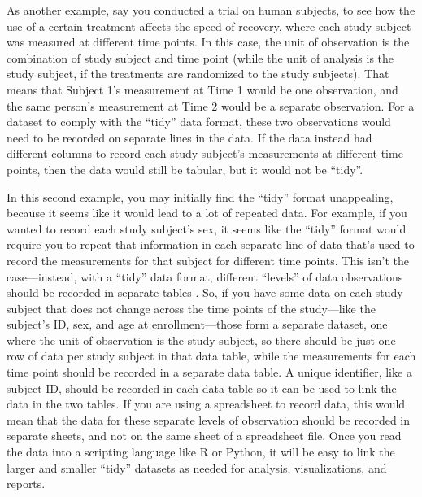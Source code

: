\documentclass[]{tufte-book}
\begin{document}
As another example, say you conducted a trial on human subjects, to see how the
use of a certain treatment affects the speed of recovery, where each study
subject was measured at different time points. In this case, the unit of
observation is the combination of study subject and time point (while the unit
of analysis is the study subject, if the treatments are randomized to the study
subjects). That means that Subject 1's measurement at Time 1 would be one
observation, and the same person's measurement at Time 2 would be a separate
observation. For a dataset to comply with the ``tidy'' data format, these two
observations would need to be recorded on separate lines in the data. If the
data instead had different columns to record each study subject's measurements
at different time points, then the data would still be tabular, but it would not
be ``tidy''.

In this second example, you may initially find the ``tidy'' format unappealing,
because it seems like it would lead to a lot of repeated data. For example, if
you wanted to record each study subject's sex, it seems like the ``tidy'' format
would require you to repeat that information in each separate line of data
that's used to record the measurements for that subject for different time
points. This isn't the case---instead, with a ``tidy'' data format, different
``levels'' of data observations should be recorded in separate tables \citep{wickham2014tidy}.
So, if you have some data on each study subject that does not change across the
time points of the study---like the subject's ID, sex, and age at
enrollment---those form a separate dataset, one where the unit of observation is
the study subject, so there should be just one row of data per study subject in
that data table, while the measurements for each time point should be recorded
in a separate data table. A unique identifier, like a subject ID, should be
recorded in each data table so it can be used to link the data in the two
tables. If you are using a spreadsheet to record data, this would mean that the
data for these separate levels of observation should be recorded in separate
sheets, and not on the same sheet of a spreadsheet file. Once you read the data
into a scripting language like R or Python, it will be easy to link the larger
and smaller ``tidy'' datasets as needed for analysis, visualizations, and reports.
\end{document}
